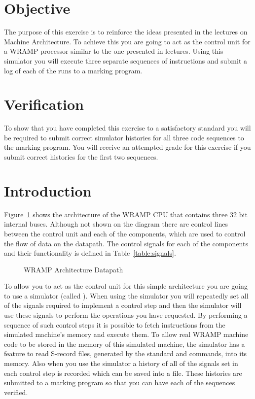 \documentclass[a4paper,10pt]{article}
\begin{document}

\section{Objective}

The purpose of this exercise is to reinforce the ideas presented in
the lectures on Machine Architecture. To achieve this you are going to
act as the control unit for a WRAMP processor similar to the one
presented in lectures. Using this simulator you will execute three
separate sequences of instructions and submit a log of each of the
runs to a marking program.

\section{Verification}

To show that you have completed this exercise to a satisfactory
standard you will be required to submit correct simulator histories
for all three code sequences to the marking program. You will receive
an attempted grade for this exercise if you submit correct histories
for the first two sequences.


\section{Introduction}

Figure~\ref{fig:datapath} shows the architecture of the WRAMP
CPU that contains three 32 bit internal buses. Although not shown on
the diagram there are control lines between the control unit and each
of the components, which are used to control the flow of data on the
datapath. The control signals for each of the components and their
functionality is defined in Table~\ref{table:signals}.

\begin{figure}[h]
  \begin{center}
    \caption{WRAMP Architecture Datapath}
    \label{fig:datapath}
  \end{center}
\end{figure}

To allow you to act as the control unit for this simple architecture
you are going to use a simulator (called ). When
using the simulator you will repeatedly set all of the signals
required to implement a control step and then the simulator will use
these signals to perform the operations you have requested. By
performing a sequence of such control steps it is possible to fetch
instructions from the simulated machine's memory and execute them. To
allow real WRAMP machine code to be stored in the memory of this
simulated machine, the simulator has a feature to read S-record files,
generated by the standard  and  commands,
into its memory. Also when you use the simulator a history of all of the
signals set in each control step is recorded which can be saved into a
file. These histories are submitted to a marking program so that you can
have each of the sequences verified.
\end{document}
